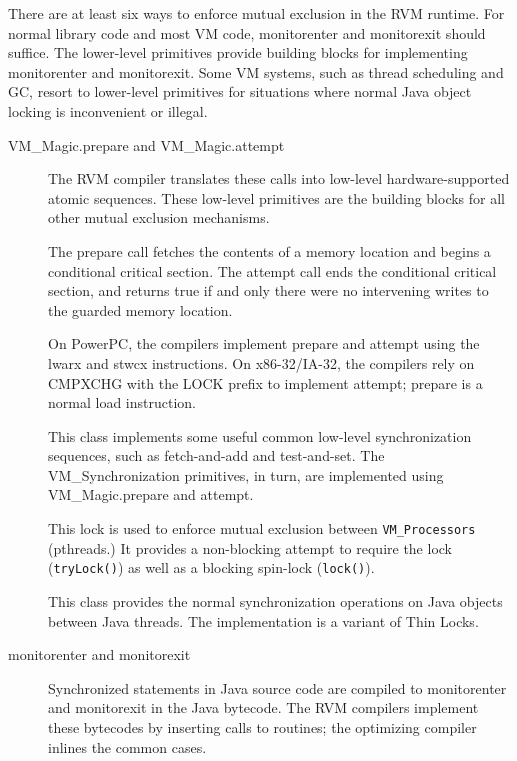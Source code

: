There are at least six ways to enforce mutual exclusion in the
RVM runtime.  For normal library code and most VM code, {\instruction monitorenter} and
{\instruction monitorexit} should suffice.  The lower-level primitives provide 
building blocks for implementing {\instruction monitorenter} and
{\instruction monitorexit}. Some VM systems,
such as thread scheduling and GC, resort to lower-level primitives for
situations where normal Java object locking is inconvenient or illegal.
\begin{description}

\item[VM\_Magic.prepare and VM\_Magic.attempt]

The RVM compiler translates these 
calls into low-level
hardware-supported atomic sequences.  These low-level primitives are the 
building blocks for all other mutual exclusion mechanisms. 

The prepare call fetches the
contents of a memory location and begins a conditional critical section.
The attempt call ends the conditional critical section, and returns true
if and only there were no intervening writes to the guarded memory
location.

On PowerPC, the compilers implement prepare and attempt using the
{\instruction lwarx}
and {\instruction stwcx} instructions.  On x86-32\-/\-IA-32, the compilers rely on
{\instruction CMPXCHG} with the
LOCK prefix to implement attempt; prepare is a normal {\instruction load} instruction.

\item[]

This class implements some useful common low-level synchronization
sequences, such as fetch-and-add and test-and-set.  The VM\_Synchronization
primitives, in turn, are implemented using VM\_Magic.prepare and attempt.

\item[]%

This lock is used to enforce mutual exclusion between {\tt VM\-\_\-Pro\-ces\-sors}
(p\-threads.)  It provides a non-blocking attempt to require the lock
({\tt tryLock()}) as well as a blocking spin-lock ({\tt lock()}).

\item[]%

This class provides the normal synchronization operations on Java objects
between Java threads.  The implementation is a variant of Thin Locks.

\item[{\instruction monitorenter} and {\instruction monitorexit}]

Synchronized statements in Java source code are compiled to
{\instruction monitorenter}
and {\instruction monitorexit} in the Java bytecode.  The RVM compilers implement these
bytecodes by inserting calls to  routines; 
the optimizing
compiler inlines the common cases.

\end{description}

